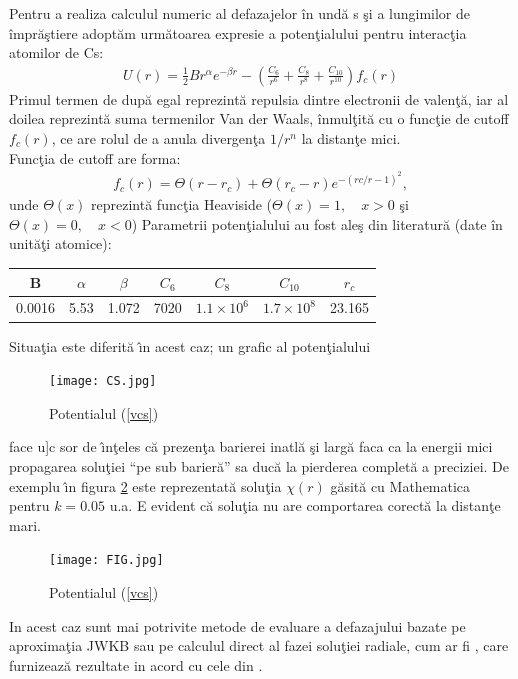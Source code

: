 Pentru a realiza calculul numeric al defazajelor \^{i}n und\u{a} s \c{s}i a lungimilor de \^{i}mpr\u{a}\c{s}tiere adopt\u{a}m urm\u{a}toarea expresie a poten\c{t}ialului pentru interac\c{t}ia atomilor de Cs:
\begin{align}
U(r)=\frac{1}{2}Br^\alpha e^{-\beta r}-\left(\frac{C_6}{r^6}+\frac{C_8}{r^8}+\frac{C_{10}}{r^{10}}\right)f_c(r)\label{vcs}
\end{align}
Primul termen de dup\u{a} egal reprezint\u{a} repulsia dintre electronii de valen\c{t}\u{a}, iar al doilea reprezint\u{a} suma termenilor Van der Waals, \^{i}nmul\c{t}it\u{a} cu o func\c{t}ie de cutoff $f_c(r)$, ce are rolul de a anula divergen\c{t}a $1/r^n$ la distan\c{t}e mici.\\
Func\c{t}ia de cutoff are forma:
\begin{align}
f_c(r)=\Theta(r-r_c)+\Theta(r_c-r)e^{-(rc/r-1)^2},
\end{align}
unde $\Theta(x)$ reprezint\u{a} func\c{t}ia Heaviside ($\Theta(x)=1,\quad x>0$ \c{s}i $\Theta(x)=0,\quad x<0$)
Parametrii poten\c{t}ialului au fost ale\c{s} din literatur\u{a} \cite{art-VW} (date \^{i}n unit\u{a}\c{t}i atomice):
\begin{center}
 \begin{tabular}{||c c c c c c c||} 
 \hline
 B & $\alpha$ & $\beta$ & $C_6$ & $C_8$ & $C_{10}$ & $r_c$ \\ [0.5ex] 
 \hline 
 0.0016 & 5.53 & 1.072 & 7020 & $1.1 \times 10^6$ & $1.7 \times 10^8$ & 23.165 \\ 
  \hline
\end{tabular}
\end{center}

Situa\c tia este diferit\u a  \^{\i}n acest  caz; un grafic al poten\c tialului
\begin{figure}[h]
  \centering
  \texttt{[image: CS.jpg]}
  {\caption{Potentialul (\ref{vcs})\label{gvcs}}}
  \end{figure}
  face u]c sor de \^{\i}n\c teles c\u a prezen\c ta barierei inatl\u a \c si larg\u a faca ca la energii mici propagarea solu\c tiei ``pe sub barier\u a'' sa duc\u a la pierderea complet\u a a preciziei.
  De exemplu \^{\i}n figura \ref{figpsi} este reprezentat\u a solu\c tia $\chi(r)$ g\u asit\u a cu Mathematica pentru $k=0.05$ u.a. E evident c\u a solu\c tia nu are comportarea corect\u a la distan\c te mari.
\begin{figure}[h]
  \centering
  \texttt{[image: FIG.jpg]}
  {\caption{Potentialul (\ref{vcs})\label{figpsi}}}
  \end{figure}

  
In acest caz sunt mai potrivite metode de evaluare a defazajului bazate pe aproxima\c tia JWKB sau pe calculul direct al fazei solu\c tiei radiale, cum ar fi \cite{ris}, care furnizeaz\u a rezultate in acord cu cele din \cite{art-VW}. 



 

